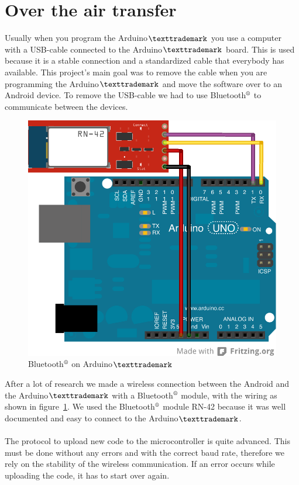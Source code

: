 \section{Over the air transfer}
Usually when you program the Arduino$\texttrademark$ you use a computer with a USB-cable connected to the Arduino$\texttrademark$ board. This is used because it is a stable connection and a standardized cable that everybody has available. This project's main goal was to remove the cable when you are programming the Arduino$\texttrademark$ and move the software over to an Android device. To remove the USB-cable we had to use Bluetooth$\textsuperscript{\textregistered}$ to communicate between the devices.
\\
\begin{figure}[H]
\includegraphics[scale=1.2]{images/wiring_simple.png}
\caption{Bluetooth$\textsuperscript{\textregistered}$ on Arduino$\texttrademark$}
\label{fig:SimpleArduinoWiring}
\end{figure}

After a lot of research we made a wireless connection between the Android and the Arduino$\texttrademark$ with a Bluetooth$\textsuperscript{\textregistered}$ module, with the wiring as shown in figure~\ref{fig:SimpleArduinoWiring}. We used the Bluetooth$\textsuperscript{\textregistered}$ module RN-42 because it was well documented and easy to connect to the Arduino$\texttrademark$.\\
\\
The protocol to upload new code to the microcontroller is quite advanced. This must be done without any errors and with the correct baud rate, therefore we rely on the stability of the wireless communication. If an error occurs while uploading the code, it has to start over again.
